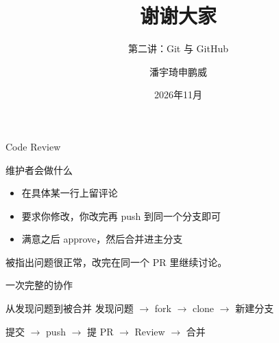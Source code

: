 \documentclass[aspectratio=169]{beamer}
\begin{document}
\begin{frame}{Code Review}
	\begin{block}{维护者会做什么}
		\begin{itemize}
			\item 在具体某一行上留评论
			\item 要求你修改，你改完再 push 到同一个分支即可
			\item 满意之后 approve，然后合并进主分支
		\end{itemize}
	\end{block}
	\begin{center}
		\alert{被指出问题很正常，改完在同一个 PR 里继续讨论。}
	\end{center}
\end{frame}

\begin{frame}{一次完整的协作}
	\begin{block}{从发现问题到被合并}
		\centering
		发现问题
		$\longrightarrow$
		fork
		$\longrightarrow$
		clone
		$\longrightarrow$
		新建分支
		
		提交
		$\longrightarrow$
		push
		$\longrightarrow$
		提 PR
		$\longrightarrow$
		Review
		$\longrightarrow$
		合并
	\end{block}
\end{frame}

\begin{frame}
	\title{谢谢大家}
	\subtitle{第二讲：Git 与 GitHub}
	\author{潘宇琦\hspace*{1em}申鹏威}
	\date{2026年11月}
	\titlepage
\end{frame}
\end{document}
